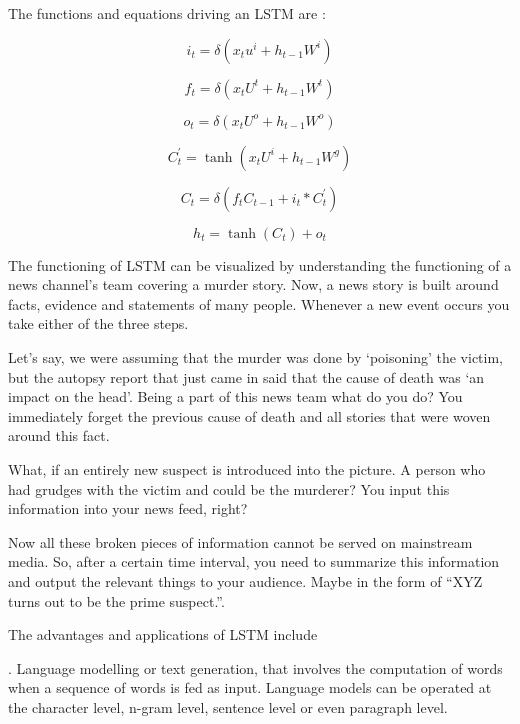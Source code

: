 \documentclass[12pt]{article}
\newcommand{\nd}{\noindent}
\begin{document}
\nd The functions and equations driving an LSTM are : 

\begin{equation*}
i_t =\delta(x_t u^i + h_{t-1} W^i)
\end{equation*}

\begin{equation*}
f_t = \delta(x_t U^t + h_{t-1} W^t)
\end{equation*}

\begin{equation*}
o_t = \delta(x_t U^o + h_{t-1} W^o)
\end{equation*}

\begin{equation*}
C^{'}_t = \tanh(x_t U^i + h_{t-1} W^g)
\end{equation*}

\begin{equation*}
C_t = \delta(f_t C_{t-1} + i_t *  C^{'}_t)
\end{equation*}

\begin{equation*}
h_t = \tanh(C_t ) + o_t
\end{equation*}

\nd The functioning of LSTM can be visualized by understanding the functioning of a news channel’s team covering a murder story. Now, a news story is built around facts, evidence and statements of many people. Whenever a new event occurs you take either of the three steps.

\nd Let’s say, we were assuming that the murder was done by ‘poisoning’ the victim, but the autopsy report that just came in said that the cause of death was ‘an impact on the head’. Being a part of this news team what do you do? You immediately forget the previous cause of death and all stories that were woven around this fact.

\nd What, if an entirely new suspect is introduced into the picture. A person who had grudges with the victim and could be the murderer? You input this information into your news feed, right?

\nd Now all these broken pieces of information cannot be served on mainstream media. So, after a certain time interval, you need to summarize this information and output the relevant things to your audience. Maybe in the form of “XYZ turns out to be the prime suspect.”.

\nd The advantages and applications of LSTM include 

\nd 1. Language modelling or text generation, that involves the computation of words when a sequence of words is fed as input. Language models can be operated at the character level, n-gram level, sentence level or even paragraph level.
\end{document}
